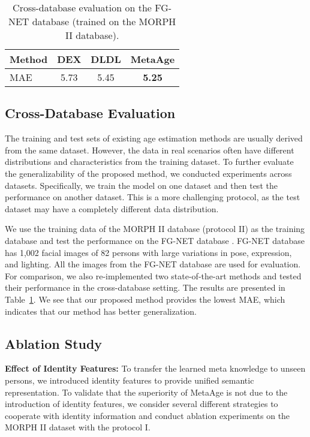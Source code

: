 \documentclass[journal,twoside]{IEEEtran}
\begin{document}
\begin{table}[t]
  \caption{Cross-database evaluation on the FG-NET database (trained on the MORPH II database).}
  \label{table:crossdata}
  \renewcommand\tabcolsep{15pt}
  \centering
  \begin{tabular}{lccc}
  \toprule
  Method & DEX \cite{rothe2018deep} & DLDL \cite{gao2017deep} & MetaAge   \\
  \midrule
  MAE & 5.73 & 5.45 &  \textbf{5.25} \\
  \bottomrule
  \end{tabular}
\end{table}


\subsection{Cross-Database Evaluation}
The training and test sets of existing age estimation methods are usually derived from the same dataset.  However, the data in real scenarios often have different distributions and characteristics from the training dataset. To further evaluate the generalizability of the proposed method, we conducted experiments across datasets. Specifically, we train the model on one dataset and then test the performance on another dataset. This is a more challenging protocol, as the test dataset may have a completely different data distribution.

We use the training data of the MORPH II database (protocol II) as the training database and test the performance on the FG-NET database \cite{panis2016overview}. FG-NET database \cite{panis2016overview} has 1,002 facial images of 82 persons with large variations in pose, expression, and lighting. All the images from the FG-NET database are used for evaluation. For comparison, we also re-implemented two state-of-the-art methods and tested their performance in the cross-database setting. The results are presented in Table~\ref{table:crossdata}. We see that our proposed method provides the lowest MAE, which indicates that our method has better generalization.


\subsection{Ablation Study}
\textbf{Effect of Identity Features:} To transfer the learned meta knowledge to unseen persons, we introduced identity features to provide unified semantic representation. To validate that the superiority of MetaAge is not due to the introduction of identity features, we consider several different strategies to cooperate with identity information and conduct ablation experiments on the MORPH II dataset with the protocol I.
\end{document}
